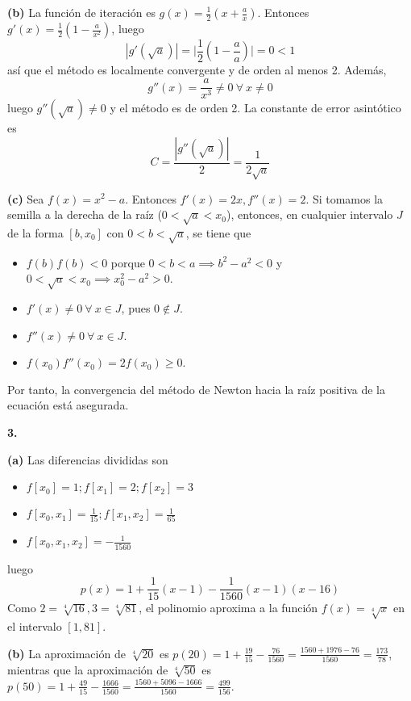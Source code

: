 \documentclass[12pt]{report}
\begin{document}
\vspace{2mm}
\textbf{(b) } La función de iteración es $g(x) = \frac{1}{2} (x + \frac{a}{x})$. Entonces $g'(x) = \frac{1}{2}(1-\frac{a}{x^2})$, luego
\[|g'(\sqrt{a})| =  \biggl|\frac{1}{2}(1-\frac{a}{a}) \biggr| = 0 < 1\]
así que el método es localmente convergente y de orden al menos 2. Además,
\[g''(x) = \frac{a}{x^3} \neq 0 \ \forall \ x \neq 0\]
luego $g''(\sqrt{a}) \neq 0$ y el método es de orden 2. La constante de error asintótico es
\[C = \frac{|g''(\sqrt{a})|}{2} = \frac{1}{2\sqrt{a}}\]

\vspace{2mm}
\textbf{(c) } Sea $f(x) = x^2 - a$. Entonces $f'(x) = 2x, f''(x) = 2$. Si tomamos la semilla a la derecha de la raíz ($0 < \sqrt{a} < x_0$), entonces, en cualquier intervalo $J$ de la forma $[b,x_0]$ con $0 < b < \sqrt{a}$, se tiene que
\begin{itemize}
    \item $f(b)f(b) < 0 $ porque $0<b<a \implies b^2 -a^2< 0$ y $0<\sqrt{a}<x_0 \implies x_0^2-a^2>0$.
    \item $f'(x) \neq 0 \ \forall \ x \in J$, pues $0 \notin J$.
    \item $f''(x) \neq 0 \ \forall \ x \in J$.
    \item $f(x_0)f''(x_0) = 2f(x_0) \geq 0$.
\end{itemize}
Por tanto, la convergencia del método de Newton hacia la raíz positiva de la ecuación está asegurada.

\vspace{2mm}
\textbf{3. }

\vspace{2mm}
\textbf{(a) } Las diferencias divididas son
\begin{itemize}
    \item $f[x_0] = 1; f[x_1] = 2; f[x_2] = 3$
    \item $\displaystyle f[x_0,x_1] = \frac{1}{15}; f[x_1,x_2] = \frac{1}{65}$
    \item $\displaystyle f[x_0,x_1,x_2] = -\frac{1}{1560}$
\end{itemize}
luego \[p(x) = 1 + \frac{1}{15}(x-1) - \frac{1}{1560}(x-1)(x-16)\]
Como $2 = \sqrt[4]{16}, 3 = \sqrt[4]{81}$, el polinomio aproxima a la función $f(x) = \sqrt[4]{x}$ en el intervalo $[1,81]$.

\vspace{2mm}
\textbf{(b) } La aproximación de $\sqrt[4]{20}$ es $p(20) = 1 + \frac{19}{15} - \frac{76}{1560} = \frac{1560 + 1976-76}{1560} = \frac{173}{78}$, mientras que la aproximación de $\sqrt[4]{50}$ es $p(50) = 1+\frac{49}{15}-\frac{1666}{1560} = \frac{1560+5096-1666}{1560} = \frac{499}{156}$.
\end{document}
